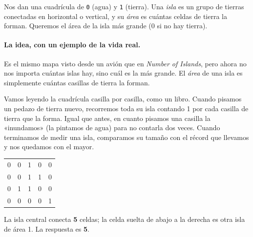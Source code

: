 
Nos dan una cuadrícula de \texttt{0} (agua) y \texttt{1} (tierra). Una
\emph{isla} es un grupo de tierras conectadas en horizontal o vertical, y su
\emph{área} es cuántas celdas de tierra la forman. Queremos el área de la
isla más grande (0 si no hay tierra).

\paragraph{La idea, con un ejemplo de la vida real.} Es el mismo mapa visto
desde un avión que en \emph{Number of Islands}, pero ahora no nos importa
cuántas islas hay, sino cuál es la más grande. El \emph{área} de una isla es
simplemente cuántas casillas de tierra la forman.

Vamos leyendo la cuadrícula casilla por casilla, como un libro. Cuando pisamos un
pedazo de tierra nuevo, recorremos toda su isla contando 1 por cada casilla de
tierra que la forma. Igual que antes, en cuanto pisamos una casilla la
«inundamos» (la pintamos de agua) para no contarla dos veces. Cuando terminamos
de medir una isla, comparamos su tamaño con el récord que llevamos y nos
quedamos con el mayor.

\begin{center}
\ttfamily
\begin{tabular}{ccccc}
0 & 0 & 1 & 0 & 0\\
0 & 0 & 1 & 1 & 0\\
0 & 1 & 1 & 0 & 0\\
0 & 0 & 0 & 0 & 1\\
\end{tabular}
\end{center}

\noindent La isla central conecta \textbf{5} celdas; la celda suelta de abajo
a la derecha es otra isla de área 1. La respuesta es \textbf{5}.


